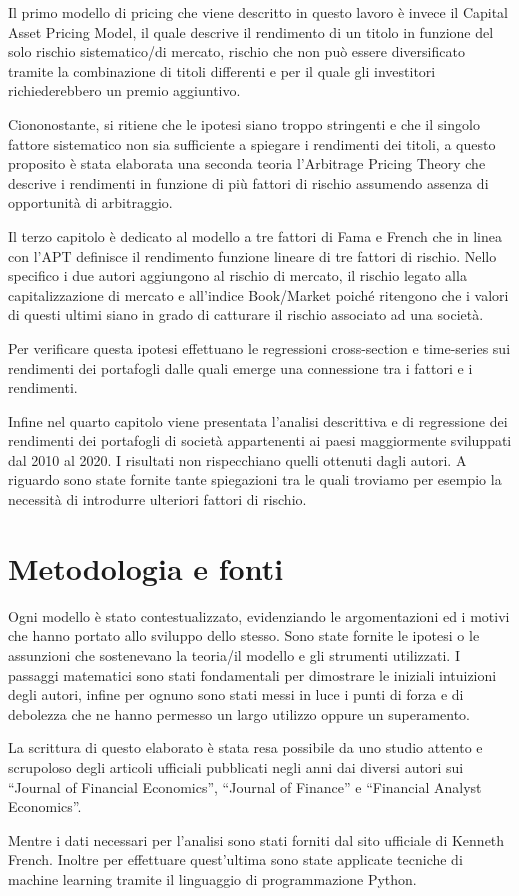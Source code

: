 Il primo modello di pricing che viene descritto in questo lavoro è invece il Capital Asset Pricing Model, il quale descrive il rendimento di un titolo in funzione del solo rischio sistematico/di mercato, rischio che non può essere diversificato tramite la combinazione di titoli differenti e per il quale gli investitori richiederebbero un premio aggiuntivo.

Ciononostante, si ritiene che le ipotesi siano troppo stringenti e che il singolo fattore sistematico non sia sufficiente a spiegare i rendimenti dei titoli, a questo proposito è stata elaborata una seconda teoria l'Arbitrage Pricing Theory che descrive i rendimenti in funzione di più fattori di rischio assumendo assenza di opportunità di arbitraggio.

Il terzo capitolo è dedicato al modello a tre fattori di Fama e French che in linea con l'APT definisce il rendimento funzione lineare di tre fattori di rischio. Nello specifico i due autori aggiungono al rischio di mercato, il rischio legato alla capitalizzazione di mercato e all'indice Book/Market poiché ritengono che i valori di questi ultimi siano in grado di catturare il rischio associato ad una società. 

Per verificare questa ipotesi effettuano le regressioni cross-section e time-series sui rendimenti dei portafogli dalle quali emerge una connessione tra i fattori e i rendimenti. 

Infine nel quarto capitolo viene presentata l'analisi descrittiva e di regressione dei rendimenti dei portafogli di società appartenenti ai paesi maggiormente sviluppati dal 2010 al 2020. I risultati non rispecchiano quelli ottenuti dagli autori. A riguardo sono state fornite tante spiegazioni tra le quali troviamo per esempio la necessità di introdurre ulteriori fattori di rischio. 

\section{Metodologia e fonti}

Ogni modello è stato contestualizzato, evidenziando le argomentazioni ed i motivi che hanno portato allo sviluppo dello stesso. Sono state fornite le ipotesi o le assunzioni che sostenevano la teoria/il modello e gli strumenti utilizzati. I passaggi matematici sono stati fondamentali per dimostrare le iniziali intuizioni degli autori, infine per ognuno sono stati messi in luce i punti di forza e di debolezza che ne hanno permesso un largo utilizzo oppure un superamento. 

La scrittura di questo elaborato è stata resa possibile da uno studio attento e scrupoloso degli articoli ufficiali pubblicati negli anni dai diversi autori sui “Journal of Financial Economics”, “Journal of Finance” e “Financial Analyst Economics”. 

Mentre i dati necessari per l'analisi sono stati forniti dal sito ufficiale di Kenneth French. Inoltre per effettuare quest'ultima sono state applicate tecniche di machine learning tramite il linguaggio di programmazione Python.






